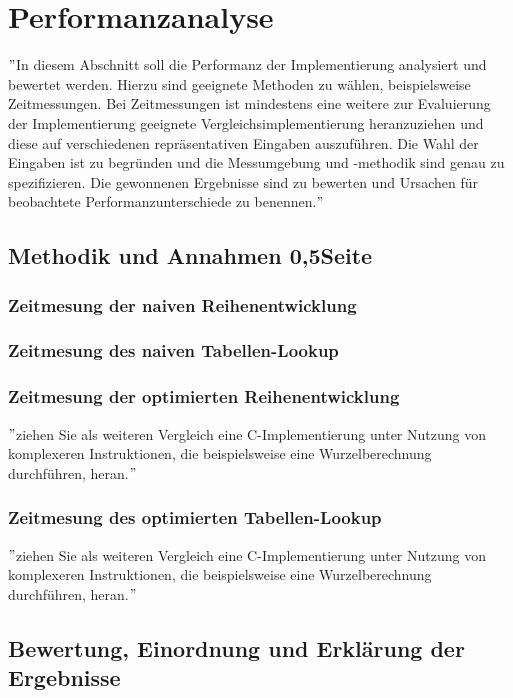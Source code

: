 \documentclass[course=erap]{aspdoc}
\begin{document}
    \section{Performanzanalyse}
    \("\)In diesem Abschnitt soll die Performanz der Implementierung analysiert und bewertet werden.
    Hierzu sind geeignete Methoden zu wählen, beispielsweise Zeitmessungen.
    Bei Zeitmessungen ist mindestens eine weitere zur Evaluierung der Implementierung geeignete Vergleichsimplementierung
    heranzuziehen und diese auf verschiedenen repräsentativen Eingaben auszuführen.
    Die Wahl der Eingaben ist zu begründen und die Messumgebung und -methodik sind genau zu spezifizieren.
    Die gewonnenen Ergebnisse sind zu bewerten und Ursachen für beobachtete Performanzunterschiede zu benennen.\("\)

    \subsection{Methodik und Annahmen 0,5Seite}

    \subsubsection{Zeitmesung der naiven Reihenentwicklung}

    \subsubsection{Zeitmesung des naiven Tabellen-Lookup}

    \subsubsection{Zeitmesung der optimierten Reihenentwicklung}
    \("\)ziehen Sie als weiteren Vergleich eine C-Implementierung unter Nutzung von komplexeren Instruktionen, die beispielsweise eine Wurzelberechnung durchführen, heran.\("\)

    \subsubsection{Zeitmesung des optimierten Tabellen-Lookup}
    \("\)ziehen Sie als weiteren Vergleich eine C-Implementierung unter Nutzung von komplexeren Instruktionen, die beispielsweise eine Wurzelberechnung durchführen, heran.\("\)

    \subsection{Bewertung, Einordnung und Erklärung der Ergebnisse}
\end{document}
